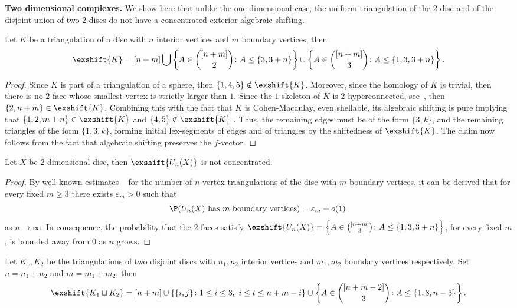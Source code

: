 %
\noindent
{\bf Two dimensional complexes.}
We show here that unlike the one-dimensional case, the uniform triangulation of the $2$-disc and of the disjoint union of two $2$-discs do not have a concentrated exterior algebraic shifting.
\begin{proposition}
    \label{p:discshift}
    Let $K$ be a triangulation of a disc with $n$ interior vertices and $m$ boundary vertices, then $$\exshift{K} = [n+m] \bigcup \left \{A\in \binom{[n+m]}{2} \colon A \leq \{3,3+n\} \right \} \cup \left \{A \in \binom{[n+m]}{3} \colon A \leq \{1,3,3+n\} \right \} .$$
\end{proposition}
\begin{proof}
    Since $K$ is part of a triangulation of a sphere, then $\{1,4,5\} \notin \exshift{K}$. Moreover, since the homology of $K$ is trivial, then there is no $2$-face whose smallest vertex is strictly larger than $1$. Since the $1$-skeleton of $K$ is $2$-hyperconnected, see~\cite{kalai85-hyperconnectivity}, then $\{2,n+m\} \in \exshift{K}$. Combining this with the fact that $K$ is Cohen-Macaulay, even shellable, its algebraic shifting is pure implying that $\{1,2,m+n\}\in \exshift{K}$ and $\{4,5\}\notin \exshift{K}$ . Thus, the remaining edges must be of the form $\{3,k\}$, and the remaining triangles of the form $\{1,3,k\}$,    
    forming initial lex-segments of edges and of triangles by the shiftedness of $\exshift{K}$. The claim now follows from the fact that algebraic shifting preserves the $f$-vector.
\end{proof}
%
\begin{corollary}
    \label{c:discsconcentration}
    Let $X$ be $2$-dimensional disc, then $\exshift{U_n(X)}$ is not concentrated. 
\end{corollary}
\begin{proof}
    By well-known estimates ~\cite{Tutte1962,goulden2004combinatorial} for the number of $n$-vertex triangulations of the disc with $m$ boundary vertices, it can be derived that for every fixed $m\ge 3$ there exists $\varepsilon_m>0$ such that
    \[
    \P(U_n(X) \text{ has $m$ boundary vertices}) =\varepsilon_m +o(1)\,\]
    as $n\to \infty$. 
    In consequence, the probability that the $2$-faces satisfy $\exshift{U_n(X)} = \left \{A \in \binom{[n+m]}{3} \colon A \leq \{1,3,3+n\} \right \}$, for every fixed $m$, is bounded away from $0$ as $n$ grows.
\end{proof}
%
\begin{lemma}
    \label{c:twodiscshift}
    Let $K_1,K_2$ be the triangulations of two disjoint discs with $n_1,n_2$ interior vertices and $m_1,m_2$ boundary vertices respectively. Set $n=n_1+n_2$ and $m=m_1+m_2$, then
    $$\exshift{K_1\sqcup K_2} = [n+m] \cup \{\{i,j\}\colon 1\leq i\leq 3,~i \leq t\leq n+m-i\}\cup \left \{A\in \binom{[n+m-2]}{3}\colon A\leq \{1,3,n-3\} \right \}.$$
\end{lemma}

